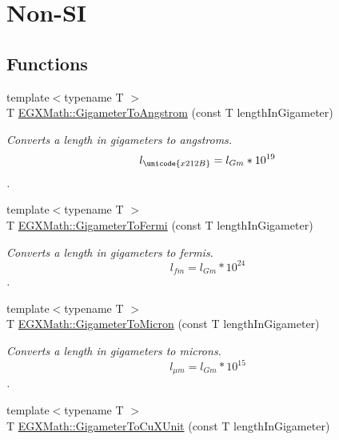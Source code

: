 \hypertarget{group___e_g_x_math-_conversions-_length_conversions-_s_i-_gigameter-_non-_s_i}{}\section{Non-\/\+SI}
\label{group___e_g_x_math-_conversions-_length_conversions-_s_i-_gigameter-_non-_s_i}
\subsection*{Functions}
\begin{DoxyCompactItemize}
\item 
{\footnotesize template$<$typename T $>$ }\\T \mbox{\hyperlink{group___e_g_x_math-_conversions-_length_conversions-_s_i-_gigameter-_non-_s_i_ga622e85e3f663039f3802b29d25655989}{E\+G\+X\+Math\+::\+Gigameter\+To\+Angstrom}} (const T length\+In\+Gigameter)
\begin{DoxyCompactList}\small\item\em Converts a length in gigameters to angstroms. \[ l_{\unicode{x212B}}=l_{Gm} * 10^{19} \]. \end{DoxyCompactList}\item 
{\footnotesize template$<$typename T $>$ }\\T \mbox{\hyperlink{group___e_g_x_math-_conversions-_length_conversions-_s_i-_gigameter-_non-_s_i_gadf6d730ad6e47bc8be214f3ef59b48ca}{E\+G\+X\+Math\+::\+Gigameter\+To\+Fermi}} (const T length\+In\+Gigameter)
\begin{DoxyCompactList}\small\item\em Converts a length in gigameters to fermis. \[ l_{fm}=l_{Gm} * 10^{24} \]. \end{DoxyCompactList}\item 
{\footnotesize template$<$typename T $>$ }\\T \mbox{\hyperlink{group___e_g_x_math-_conversions-_length_conversions-_s_i-_gigameter-_non-_s_i_ga90426d22455e96b1f61e1850c7b89f77}{E\+G\+X\+Math\+::\+Gigameter\+To\+Micron}} (const T length\+In\+Gigameter)
\begin{DoxyCompactList}\small\item\em Converts a length in gigameters to microns. \[ l_{\mu m}=l_{Gm} * 10^{15} \]. \end{DoxyCompactList}\item 
{\footnotesize template$<$typename T $>$ }\\T \mbox{\hyperlink{group___e_g_x_math-_conversions-_length_conversions-_s_i-_gigameter-_non-_s_i_gab542297b31676ef5b3cf62f0c63a6f20}{E\+G\+X\+Math\+::\+Gigameter\+To\+Cu\+X\+Unit}} (const T length\+In\+Gigameter)

\end{DoxyCompactItemize}
